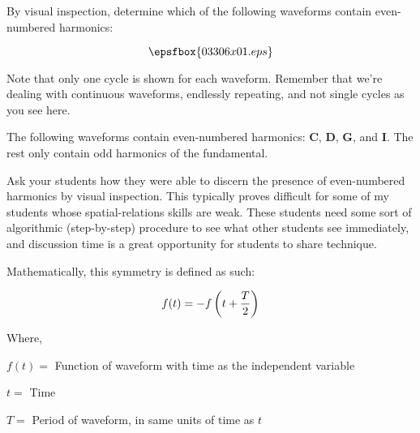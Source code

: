 

By visual inspection, determine which of the following waveforms contain even-numbered harmonics:

$$\epsfbox{03306x01.eps}$$

Note that only one cycle is shown for each waveform.  Remember that we're dealing with continuous waveforms, endlessly repeating, and not single cycles as you see here.







The following waveforms contain even-numbered harmonics: {\bf C}, {\bf D}, {\bf G}, and {\bf I}.  The rest only contain odd harmonics of the fundamental.







Ask your students how they were able to discern the presence of even-numbered harmonics by visual inspection.  This typically proves difficult for some of my students whose spatial-relations skills are weak.  These students need some sort of algorithmic (step-by-step) procedure to see what other students see immediately, and discussion time is a great opportunity for students to share technique.

Mathematically, this symmetry is defined as such:

$$f(t) = -f \left(t + {T \over 2} \right)$$

\noindent
Where,

$f(t) = $ Function of waveform with time as the independent variable

$t = $ Time

$T = $ Period of waveform, in same units of time as $t$




